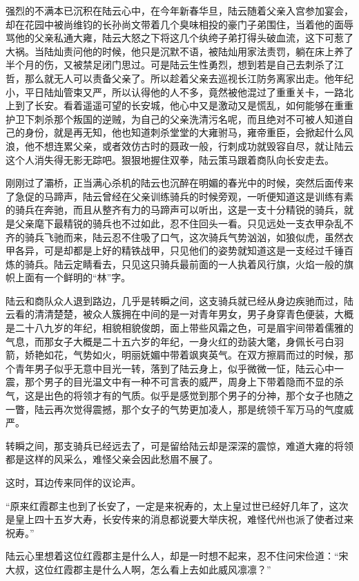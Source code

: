 强烈的不满本已沉积在陆云心中，在今年新春华旦，陆云随着父亲入宫参加宴会，却在花园中被尚维钧的长孙尚文带着几个臭味相投的豪门子弟围住，当着他的面辱骂他的父亲私通大雍，陆云大怒之下将这几个纨绔子弟打得头破血流，这下可惹了大祸。当陆灿责问他的时候，他只是沉默不语，被陆灿用家法责罚，躺在床上养了半个月的伤，又被禁足闭门思过。可是陆云生性勇烈，想到若是自己去刺杀了江哲，那么就无人可以责备父亲了。所以趁着父亲去巡视长江防务离家出走。他年纪小，平日陆灿管束又严，所以认得他的人不多，竟然被他混过了重重关卡，一路北上到了长安。看着遥遥可望的长安城，他心中又是激动又是慌乱，如何能够在重重护卫下刺杀那个叛国的逆贼，为自己的父亲洗清污名呢，而且绝对不可被人知道自己的身份，就是再无知，他也知道刺杀堂堂的大雍驸马，雍帝重臣，会掀起什么风浪，他不想连累父亲，或者效仿古时的聂政一般，行刺成功就毁容自尽，就让陆云这个人消失得无影无踪吧。狠狠地握住双拳，陆云策马跟着商队向长安走去。

刚刚过了灞桥，正当满心杀机的陆云也沉醉在明媚的春光中的时候，突然后面传来了急促的马蹄声，陆云曾经在父亲训练骑兵的时候旁观，一听便知道这是训练有素的骑兵在奔驰，而且从整齐有力的马蹄声可以听出，这是一支十分精锐的骑兵，就是父亲麾下最精锐的骑兵也不过如此，忍不住回头一看。只见远处一支衣甲杂乱不齐的骑兵飞驰而来，陆云忍不住吸了口气，这次骑兵气势汹汹，如狼似虎，虽然衣甲各异，可是却都是上好的精铁战甲，只见他们的姿势就知道这是一支经过千锤百炼的骑兵。陆云定睛看去，只见这只骑兵最前面的一人执着风行旗，火焰一般的旗帜上面有一个鲜明的“林”字。

陆云和商队众人退到路边，几乎是转瞬之间，这支骑兵就已经从身边疾驰而过，陆云看的清清楚楚，被众人簇拥在中间的是一对青年男女，男子身穿青色便装，大概是二十八九岁的年纪，相貌相貌俊朗，面上带些风霜之色，可是眉宇间带着儒雅的气息，而那女子大概是二十五六岁的年纪，一身火红的劲装大氅，身佩长弓白羽箭，娇艳如花，气势如火，明丽妩媚中带着飒爽英气。在双方擦肩而过的时候，那个青年男子似乎无意中目光一转，落到了陆云身上，似乎微微一怔，陆云心中一震，那个男子的目光温文中有一种不可言表的威严，周身上下带着隐而不显的杀气，这是出色的将领才有的气质。似乎是感觉到那个男子的分神，那个女子也随之一瞥，陆云再次觉得震撼，那个女子的气势更加凌人，那是统领千军万马的气度威严。

转瞬之间，那支骑兵已经远去了，可是留给陆云却是深深的震惊，难道大雍的将领都是这样的风采么，难怪父亲会因此愁眉不展了。

这时，耳边传来同伴的议论声。

“原来红霞郡主也到了长安了，一定是来祝寿的，太上皇过世已经好几年了，这次是皇上四十五岁大寿，长安传来的消息都说要大举庆祝，难怪代州也派了使者过来祝寿。”

陆云心里想着这位红霞郡主是什么人，却是一时想不起来，忍不住问宋俭道：“宋大叔，这位红霞郡主是什么人啊，怎么看上去如此威风凛凛？”

